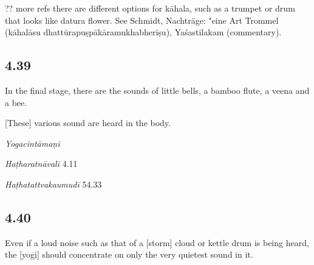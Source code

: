 \begin{ekdosis}
\begin{philcomm}[hp04_038]
?? more refs there are different options for kāhala, such as a trumpet or drum that looks like datura flower. See Schmidt, Nachträge: "eine Art Trommel (kāhalāsu dhattūrapuṣpākāramukhabherīṣu), Yaśastilakam (commentary).
\end{philcomm}

\subsection*{4.39}
\begin{translation}[hp04_039]
In the final stage, there are the sounds of little bells, a bamboo flute, a veena and a bee.

[These] various sound are heard in the body.
\end{translation}


\begin{testimonia}[hp04_039]
\emph{Yogacintāmaṇi}
\begin{versinnote}
\end{versinnote}

\emph{Haṭharatnāvalī} 4.11
\begin{versinnote}
\end{versinnote}

\emph{Haṭhatattvakaumudī} 54.33
\begin{versinnote}
\end{versinnote}
\end{testimonia}


\subsection*{4.40}
\begin{translation}[hp04_040]
Even if a loud noise such as that of a [storm] cloud or kettle drum is being heard, the [yogi] should concentrate on only the very quietest sound in it.
\end{translation}


\end{ekdosis}
